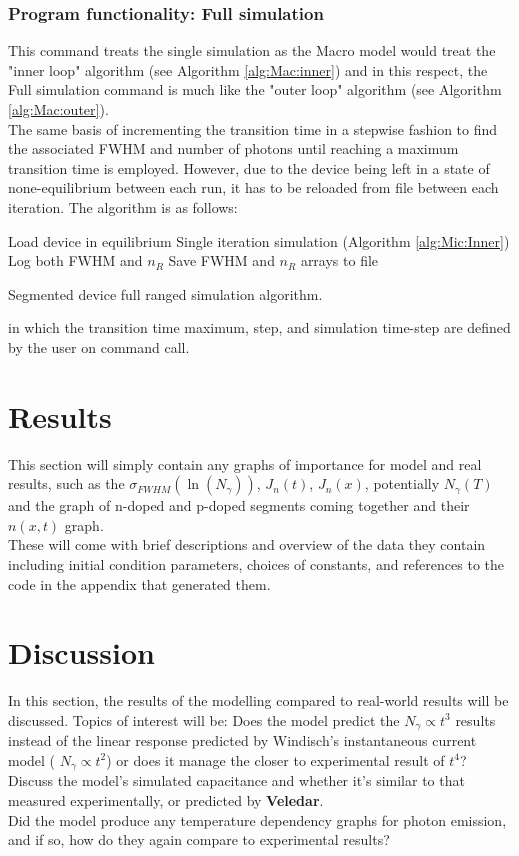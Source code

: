 \documentclass[titlepage]{article}
\begin{document}
\subsubsection{Program functionality: Full simulation}\label{sec:Mic:FullSim}
This command treats the single simulation as the Macro model would treat the "inner loop" algorithm (see Algorithm \ref{alg:Mac:inner}) and in this respect, the Full simulation command is much like the "outer loop" algorithm (see Algorithm \ref{alg:Mac:outer}).\\
The same basis of incrementing the transition time in a stepwise fashion to find the associated FWHM and number of photons until reaching a maximum transition time is employed. However, due to the device being left in a state of none-equilibrium between each run, it has to be reloaded from file between each iteration. The algorithm is as follows:\\
\begin{algorithm}[H]
	{
		Load device in equilibrium\;
		Single iteration simulation (Algorithm \ref{alg:Mic:Inner})\;
		Log both FWHM and $n_R$\;
	}
	Save FWHM and $n_R$ arrays to file\;
	\caption{\label{alg:Mic:Outer} Segmented device full ranged simulation algorithm.}
\end{algorithm}
in which the transition time maximum, step, and simulation time-step are defined by the user on command call.
\section{Results}
This section will simply contain any graphs of importance for model and real results, such as the $\sigma_{FWHM}(\ln(N_{\gamma}))$, $J_n(t)$, $J_n(x)$, potentially $N_{\gamma}(T)$ and the graph of n-doped and p-doped segments coming together and their $n(x,t)$ graph. \\ These will come with brief descriptions and overview of the data they contain including initial condition parameters, choices of constants, and references to the code in the appendix that generated them.
\section{Discussion}
In this section, the results of the modelling compared to real-world results will be discussed. Topics of interest will be: Does the model predict the $N_{\gamma} \propto t^{3} $ results instead of the linear response predicted by Windisch's instantaneous current model ( $N_{\gamma} \propto t^{2} $) or does it manage the closer to experimental result of $t^{4}$?\\
Discuss the model's simulated capacitance and whether it's similar to that measured experimentally, or predicted by \textbf{Veledar}.\\
Did the model produce any temperature dependency graphs for photon emission, and if so, how do they again compare to experimental results?
\end{document}
